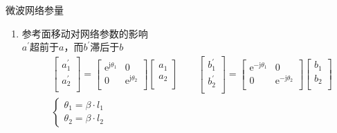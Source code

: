 \begin{frame}{微波网络参量}
    \begin{enumerate}
        \resume
        \item 参考面移动对网络参数的影响\\
        $a^{'}$超前于$a$，而$b^{'}$滞后于$b$
        \begin{align*}
            &\begin{bmatrix*}
                a_1^{'} \\
                a_2^{'} \\
            \end{bmatrix*}
            =
            \begin{bmatrix*}
                \mathrm{e}^{\mathrm{j}\theta_1} & 0 \\
                0 & \mathrm{e}^{\mathrm{j}\theta_2} \\
            \end{bmatrix*}
            \begin{bmatrix*}
                a_1 \\
                a_2 \\
            \end{bmatrix*}
            \qquad
            \begin{bmatrix*}
                b_1^{'} \\
                b_2^{'} \\
            \end{bmatrix*}
            =
            \begin{bmatrix*}
                \mathrm{e}^{-\mathrm{j}\theta_1} & 0 \\
                0 & \mathrm{e}^{-\mathrm{j}\theta_2} \\
            \end{bmatrix*}
            \begin{bmatrix*}
                b_1 \\
                b_2 \\
            \end{bmatrix*}\\
            &\begin{cases}
                \theta_1=\beta\cdot l_1 \\
                \theta_2=\beta\cdot l_2
            \end{cases}
        \end{align*}
    \end{enumerate}
\end{frame}

